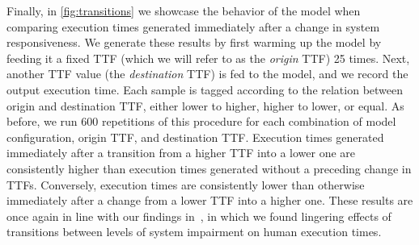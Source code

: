 Finally, in \cref{fig:transitions} we showcase the behavior of the model when comparing execution times generated immediately after a change in system responsiveness.
We generate these results by first warming up the model by feeding it a fixed \gls{TTF} (which we will refer to as the \emph{origin} \gls{TTF}) \num{25} times.
Next, another \gls{TTF} value (the \emph{destination} \gls{TTF}) is fed to the model, and we record the output execution time.
Each sample is tagged according to the relation between origin and destination \gls{TTF}, either lower to higher, higher to lower, or equal.
As before, we run \num{600} repetitions of this procedure for each combination of model configuration, origin \gls{TTF}, and destination \gls{TTF}.
Execution times generated immediately after a transition from a higher \gls{TTF} into a lower one are consistently higher than execution times generated without a preceding change in \glspl{TTF}.
Conversely, execution times are consistently lower than otherwise immediately after a change from a lower \gls{TTF} into a higher one.
These results are once again in line with our findings in~\cite{olguinmunoz2021impact}, in which we found lingering effects of transitions between levels of system impairment on human execution times.



